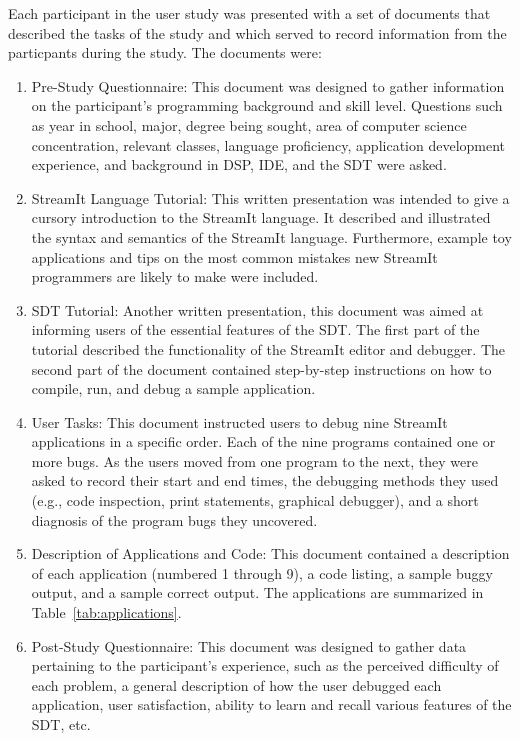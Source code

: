 \documentclass[11pt, letterpaper, onecolumn]{article}
\begin{document}
Each participant in the user study was presented with a  set of
documents that described the tasks of the study and which served to
record information from the particpants during the study. The
documents were:
\begin{enumerate}
\item Pre-Study  Questionnaire: This  document was designed  to gather
information  on  the participant's  programming  background and  skill
level. Questions such  as year in school, major,  degree being sought,
area  of computer  science concentration,  relevant  classes, language
proficiency,  application development  experience,  and background  in
DSP, IDE, and the SDT were asked.
\item  StreamIt  Language  Tutorial:  This  written  presentation  was
intended to give  a cursory introduction to the  StreamIt language. It
described  and illustrated the  syntax and  semantics of  the StreamIt
language. Furthermore,  example toy applications and tips  on the most
common  mistakes new  StreamIt  programmers are  likely  to make  were
included.
\item SDT  Tutorial: Another  written presentation, this  document was
aimed at  informing users  of the essential  features of the  SDT. The
first part of the tutorial described the functionality of the StreamIt
editor  and  debugger.  The  second  part of  the  document  contained
step-by-step instructions on  how to compile, run, and  debug a sample
application.
\item  User  Tasks:  This  document  instructed users  to  debug  nine
StreamIt applications in  a specific order. Each of  the nine programs
contained one  or more bugs.  As  the users moved from  one program to
the next,  they were asked  to record their  start and end  times, the
debugging methods they used  (e.g., code inspection, print statements,
graphical debugger),  and a short  diagnosis of the program  bugs they
uncovered.
\item Description of Applications  and Code: This document contained a
description  of  each  application  (numbered  1 through  9),  a  code
listing, a sample buggy output, and a sample correct output. The
applications are summarized in Table~\ref{tab:applications}.
\item Post-Study  Questionnaire: This document was  designed to gather
data pertaining to the participant's experience, such as the perceived
difficulty  of each  problem, a  general description  of how  the user
debugged  each application,  user satisfaction,  ability to  learn and
recall various features of the SDT, etc.
\end{enumerate}
\end{document}
